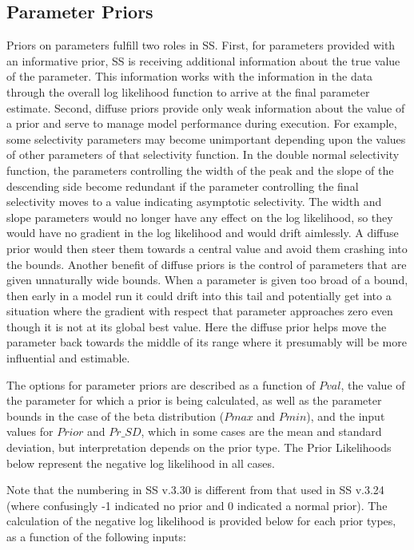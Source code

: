 \subsection{Parameter Priors}
Priors on parameters fulfill two roles in SS.  First, for parameters provided with an informative prior, SS is receiving additional information about the true value of the parameter.  This information works with the information in the data through the overall log likelihood function to arrive at the final parameter estimate.  Second, diffuse priors provide only weak information about the value of a prior and serve to manage model performance during execution.  For example, some selectivity parameters may become unimportant depending upon the values of other parameters of that selectivity function.  In the double normal selectivity function, the parameters controlling the width of the peak and the slope of the descending side become redundant if the parameter controlling the final selectivity moves to a value indicating asymptotic selectivity.  The width and slope parameters would no longer have any effect on the log likelihood, so they would have no gradient in the log likelihood and would drift aimlessly.  A diffuse prior would then steer them towards a central value and avoid them crashing into the bounds.  Another benefit of diffuse priors is the control of parameters that are given unnaturally wide bounds.  When a parameter is given too broad of a bound, then early in a model run it could drift into this tail and potentially get into a situation where the gradient with respect that parameter approaches zero even though it is not at its global best value.  Here the diffuse prior helps move the parameter back towards the middle of its range where it presumably will be more influential and estimable.  

The options for parameter priors are described as a function of $Pval$, the value of the parameter for which a prior is being calculated, as well as the parameter bounds in the case of the beta distribution ($Pmax$ and $Pmin$), and the input values for $Prior$ and $Pr\_SD$, which in some cases are the mean and standard deviation, but interpretation depends on the prior type. The Prior Likelihoods below represent the negative log likelihood in all cases.

Note that the numbering in SS v.3.30 is different from that used in SS v.3.24 (where confusingly -1 indicated no prior and 0 indicated a normal prior). The calculation of the negative log likelihood is provided below for each prior types, as a function of the following inputs:

